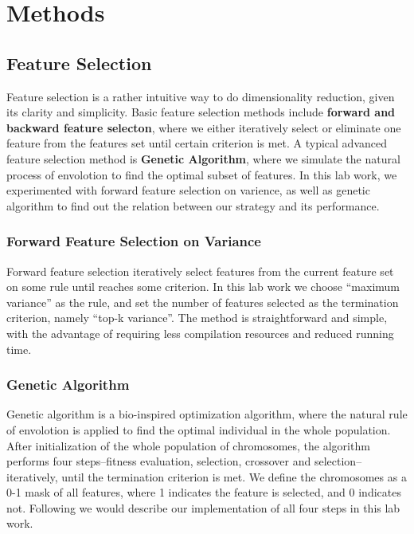 \documentclass[journal]{IEEEtran}
\begin{document}
 


\section{Methods}
\label{sec:2}
\subsection{Feature Selection} 
Feature selection is a rather intuitive way to do dimensionality reduction, given its clarity and simplicity. Basic feature selection methods include \textbf{forward and backward feature selecton}, where we either iteratively select or eliminate one feature from the features set until certain criterion is met. A typical advanced feature selection method is \textbf{Genetic Algorithm}, where we simulate the natural process of envolotion to find the optimal subset of features. In this lab work, we experimented with forward feature selection on varience, as well as genetic algorithm to find out the relation between our strategy and its performance.
~\\
\subsubsection{Forward Feature Selection on Variance}
Forward feature selection iteratively select features from the current feature set on some rule until reaches some criterion. In this lab work we choose ``maximum variance'' as the rule, and set the number of features selected as the termination criterion, namely ``top-k variance''. The method is straightforward and simple, with the advantage of requiring less compilation resources and reduced running time.

\subsubsection{Genetic Algorithm}
Genetic algorithm is a bio-inspired optimization algorithm, where the natural rule of envolotion is applied to find the optimal individual in the whole population. After initialization of the whole population of chromosomes, the algorithm performs four steps--fitness evaluation, selection, crossover and selection--iteratively, until the termination criterion is met. We define the chromosomes as a 0-1 mask of all features, where 1 indicates the feature is selected, and 0 indicates not. Following we would describe our implementation of all four steps in this lab work.
\end{document}
